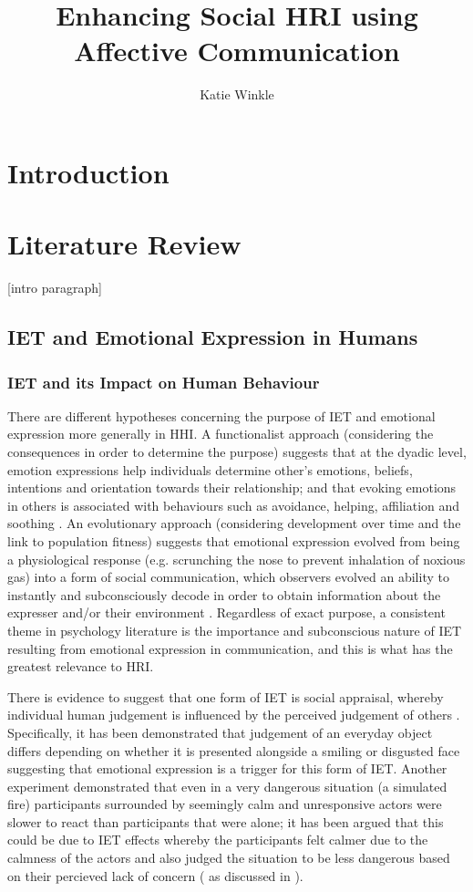 \documentclass[11pt,a4paper]{report}
\title{Enhancing Social HRI using Affective Communication}
\author{Katie Winkle}
\begin{document}
\maketitle

\chapter{Introduction}

\chapter{Literature Review}
[intro paragraph]
\section{IET and Emotional Expression in Humans}

\subsection{IET and its Impact on Human Behaviour}
There are different hypotheses concerning the purpose of IET and emotional expression more generally in HHI. A functionalist approach (considering the consequences in order to determine the purpose) suggests that at the dyadic level, emotion expressions help individuals determine other's emotions, beliefs, intentions and orientation towards their relationship; and that evoking emotions in others is associated with behaviours such as avoidance, helping, affiliation and soothing \cite{keltner1999social}. An evolutionary approach (considering development over time and the link to population fitness) suggests that emotional expression evolved from being a physiological response (e.g. scrunching the nose to prevent inhalation of noxious gas) into a form of social communication, which observers evolved an ability to instantly and subconsciously decode in order to obtain information about the expresser and/or their environment \cite{shariff2011emotion}. Regardless of exact purpose, a consistent theme in psychology literature is the importance and subconscious nature of IET resulting from emotional expression in communication, and this is what has the greatest relevance to HRI. 

There is evidence to suggest that one form of IET is social appraisal, whereby individual human judgement is influenced by the perceived judgement of others \cite{parkinson2011interpersonal}. Specifically, it has been demonstrated that judgement of an everyday object differs depending on whether it is presented alongside a smiling or disgusted face \cite{bayliss2007affective} suggesting that emotional expression is a trigger for this form of IET. Another experiment demonstrated that even in a very dangerous situation (a simulated fire) participants surrounded by seemingly calm and unresponsive actors were slower to react than participants that were alone; it has been argued that this could be due to IET effects whereby the participants felt calmer due to the calmness of the actors and also judged the situation to be less dangerous based on their percieved lack of concern (\cite{latane1968group} as discussed in \cite{parkinson2011interpersonal}).
\end{document}

